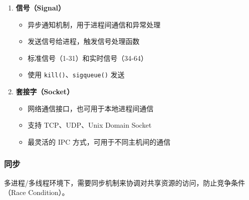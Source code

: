 \begin{enumerate}
  \item \textbf{信号（Signal）}
    \begin{itemize}
      \item 异步通知机制，用于进程间通信和异常处理
      \item 发送信号给进程，触发信号处理函数
      \item 标准信号（1-31）和实时信号（34-64）
      \item 使用 \texttt{kill()}、\texttt{sigqueue()} 发送
    \end{itemize}

  \item \textbf{套接字（Socket）}
    \begin{itemize}
      \item 网络通信接口，也可用于本地进程间通信
      \item 支持 TCP、UDP、Unix Domain Socket
      \item 最灵活的 IPC 方式，可用于不同主机间的通信
    \end{itemize}
\end{enumerate}

\subsubsection{同步}

多进程/多线程环境下，需要同步机制来协调对共享资源的访问，防止竞争条件（Race Condition）。


